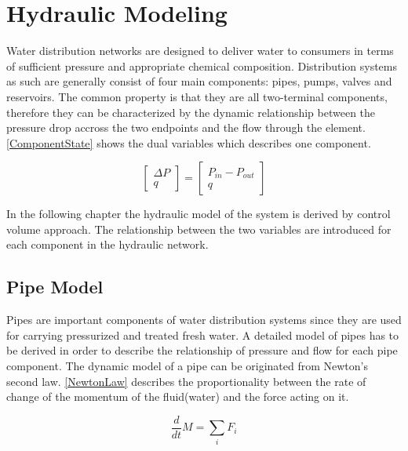 \section{Hydraulic Modeling}
\label{HydraulicModel}

Water distribution networks are designed to deliver water to consumers in terms of sufficient pressure and appropriate chemical composition. Distribution systems as such are generally consist of four main components: pipes, pumps, valves and reservoirs. The common property is that they are all two-terminal components, therefore they can be characterized by the dynamic relationship between the pressure drop accross the two endpoints and the flow through the element.\cite{Kallesoe2009}  \eqref{ComponentState} shows the dual variables which describes one component. 

\begin{equation}
\label{ComponentState}
 \begin{bmatrix}
    \Delta P \\
    q
\end{bmatrix}
=
 \begin{bmatrix}
    P_{in} - P_{out} \\
    q
\end{bmatrix}
\end{equation}

In the following chapter the hydraulic model of the system is derived by control volume approach.\cite{Hunt_Fluidmechanics} 
The relationship between the two variables are introduced for each component in the hydraulic network.


\subsection{Pipe Model} 
\label{PipeModel}
Pipes are important components of water distribution systems since they are used for carrying pressurized and treated fresh water. A detailed model of pipes has to be derived in order to describe the relationship of pressure and flow for each pipe component.  
%
The dynamic model of a pipe can be originated from Newton's second law. \eqref{NewtonLaw} describes the proportionality between the rate of change of the momentum of the fluid(water) and the force acting on it.

\begin{equation}
  \frac{d}{dt} M = \sum_i F_i
  \label{NewtonLaw}
\end{equation} 

